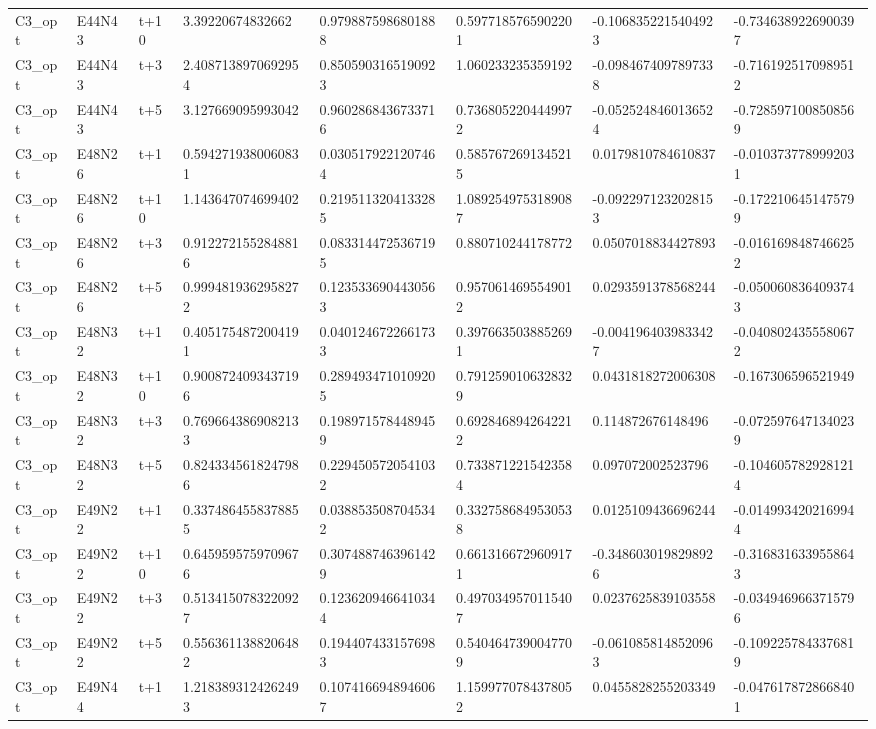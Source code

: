 \begin{landscape}
\begin{longtable}{llllllll}
C3\_opt & E44N43 & t+10 & 3.39220674832662 & 0.9798875986801888 & 0.5977185765902201 & -0.1068352215404923 & -0.7346389226900397 \\
C3\_opt & E44N43 & t+3 & 2.4087138970692954 & 0.8505903165190923 & 1.060233235359192 & -0.0984674097897338 & -0.7161925170989512 \\
C3\_opt & E44N43 & t+5 & 3.127669095993042 & 0.9602868436733716 & 0.7368052204449972 & -0.0525248460136524 & -0.7285971008508569 \\
C3\_opt & E48N26 & t+1 & 0.5942719380060831 & 0.0305179221207464 & 0.5857672691345215 & 0.0179810784610837 & -0.0103737789992031 \\
C3\_opt & E48N26 & t+10 & 1.143647074699402 & 0.2195113204133285 & 1.0892549753189087 & -0.0922971232028153 & -0.1722106451475799 \\
C3\_opt & E48N26 & t+3 & 0.9122721552848816 & 0.0833144725367195 & 0.880710244178772 & 0.0507018834427893 & -0.0161698487466252 \\
C3\_opt & E48N26 & t+5 & 0.9994819362958272 & 0.1235336904430563 & 0.9570614695549012 & 0.0293591378568244 & -0.0500608364093743 \\
C3\_opt & E48N32 & t+1 & 0.4051754872004191 & 0.0401246722661733 & 0.3976635038852691 & -0.0041964039833427 & -0.0408024355580672 \\
C3\_opt & E48N32 & t+10 & 0.9008724093437196 & 0.2894934710109205 & 0.7912590106328329 & 0.0431818272006308 & -0.167306596521949 \\
C3\_opt & E48N32 & t+3 & 0.7696643869082133 & 0.1989715784489459 & 0.6928468942642212 & 0.114872676148496 & -0.0725976471340239 \\
C3\_opt & E48N32 & t+5 & 0.8243345618247986 & 0.2294505720541032 & 0.7338712215423584 & 0.097072002523796 & -0.1046057829281214 \\
C3\_opt & E49N22 & t+1 & 0.3374864558378855 & 0.0388535087045342 & 0.3327586849530538 & 0.0125109436696244 & -0.0149934202169944 \\
C3\_opt & E49N22 & t+10 & 0.6459595759709676 & 0.3074887463961429 & 0.6613166729609171 & -0.3486030198298926 & -0.3168316339558643 \\
C3\_opt & E49N22 & t+3 & 0.5134150783220927 & 0.1236209466410344 & 0.4970349570115407 & 0.0237625839103558 & -0.0349469663715796 \\
C3\_opt & E49N22 & t+5 & 0.5563611388206482 & 0.1944074331576983 & 0.5404647390047709 & -0.0610858148520963 & -0.1092257843376819 \\
C3\_opt & E49N44 & t+1 & 1.2183893124262493 & 0.1074166948946067 & 1.1599770784378052 & 0.0455828255203349 & -0.0476178728668401 \\

\end{longtable}
\end{landscape}
